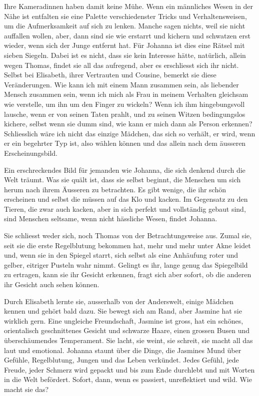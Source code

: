 \documentclass[10pt,titlepage,a5paper]{book}
\begin{document}
Ihre Kameradinnen haben damit keine Mühe. Wenn ein männliches Wesen in der Nähe ist entfalten sie eine Palette verschiedenster Tricks und Verhaltensweisen, um die Aufmerksamkeit auf sich zu lenken. Manche sagen nichts, weil sie nicht auffallen wollen, aber, dann sind sie wie erstarrt und kichern und schwatzen erst wieder, wenn sich der Junge entfernt hat.
Für Johanna ist dies eine Rätsel mit sieben Siegeln. Dabei ist es nicht, dass sie kein Interesse hätte, natürlich, allein wegen Thomas, findet sie all das aufregend, aber es erschliesst sich ihr nicht. Selbst bei Elisabeth, ihrer Vertrauten und Cousine, bemerkt sie diese Veränderungen. Wie kann ich mit einem Mann zusammen sein, als liebender Mensch zusammen sein, wenn ich mich als Frau in meinem Verhalten gleichsam wie verstelle, um ihn um den Finger zu wickeln? Wenn ich ihm hingebungsvoll lausche, wenn er von seinen Taten prahlt, und zu seinen Witzen bedingungslos kichere, selbst wenn sie dumm sind, wie kann er  mich dann als Person erkennen? Schliesslich wäre ich nicht das einzige Mädchen, das sich so verhält, er wird, wenn er ein begehrter Typ ist, also wählen können und das allein nach dem äusseren Erscheinungsbild. 

Ein erschreckendes Bild für jemanden wie Johanna, die sich denkend durch die Welt träumt. Was sie quält ist, dass sie selbst beginnt, die Menschen um sich herum nach ihrem Äusseren zu betrachten. Es gibt wenige, die ihr schön erscheinen und selbst die müssen auf das Klo und kacken. Im Gegensatz zu den Tieren, die zwar auch kacken, aber in sich perfekt und vollständig gebaut sind, sind Menschen seltsame, wenn nicht hässliche Wesen, findet Johanna.  

Sie schliesst weder sich, noch Thomas von der Betrachtungsweise aus. Zumal sie, seit sie die erste Regelblutung bekommen hat,  mehr und mehr unter Akne leidet und, wenn sie in den Spiegel starrt, sich selbst als eine Anhäufung roter und gelber, eitriger Pusteln wahr nimmt. Gelingt es ihr, lange genug das Spiegelbild zu ertragen, kann sie ihr Gesicht erkennen, fragt sich aber sofort, ob die anderen ihr Gesicht auch sehen können.

Durch Elisabeth lernte sie, ausserhalb von der Anderswelt, einige Mädchen kennen und gehört bald dazu. Sie bewegt sich am Rand, aber Jasmine hat sie wirklich gern. Eine ungleiche Freundschaft, Jasmine ist gross, hat ein schönes, orientalisch geschnittenes Gesicht und schwarze Haare, einen grossen Busen und über\-schäumendes Temperament. Sie lacht, sie weint, sie schreit, sie ma\-cht all das laut und emotional. Johanna staunt über die Dinge, die Jasmines Mund über Gefühle, Regelblutung, Jungen und das Leben verkündet. Jedes Gefühl, jede Freude, jeder Schmerz wird gepackt und bis zum Ende durchlebt und mit Worten in die Welt befördert. Sofort, dann, wenn es passiert, unreflektiert und wild. Wie macht sie das?
\end{document}
